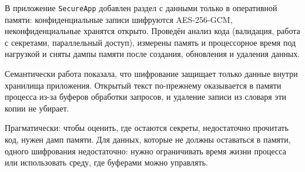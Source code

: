 
В приложение \texttt{SecureApp} добавлен раздел с данными только в
оперативной памяти: конфиденциальные записи шифруются AES-256-GCM,
неконфиденциальные хранятся открыто. Проведён анализ кода (валидация,
работа с секретами, параллельный доступ), измерены память и процессорное
время под нагрузкой и сняты дампы памяти после создания, обновления и
удаления данных.

Семантически работа показала, что шифрование защищает только данные
внутри хранилища приложения. Открытый текст по-прежнему оказывается в
памяти процесса из-за буферов обработки запросов, и удаление записи из
словаря эти копии не убирает.

Прагматически: чтобы оценить, где остаются секреты, недостаточно
прочитать код, нужен дамп памяти. Для данных, которые не должны
оставаться в памяти, одного шифрования недостаточно: нужно ограничивать
время жизни процесса или использовать среду, где буферами можно
управлять.
